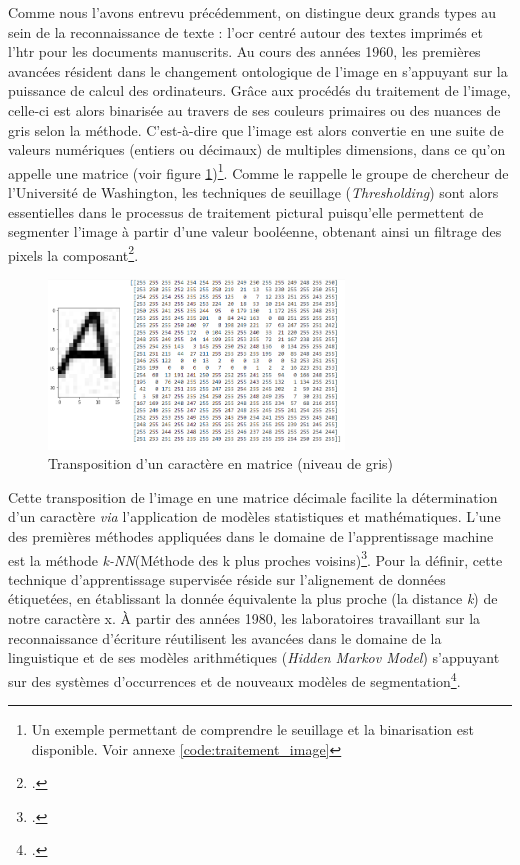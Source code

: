 	Comme nous l'avons entrevu précédemment, on distingue deux grands types au sein de la reconnaissance de texte : l'\gls{ocr} centré autour des textes imprimés et l'\gls{htr} pour les documents manuscrits. Au cours des années 1960, les premières avancées résident dans le changement ontologique de l'image en s'appuyant sur la puissance de calcul des ordinateurs. Grâce aux procédés du traitement de l'image, celle-ci est alors binarisée au travers de ses couleurs primaires ou des nuances de gris selon la méthode. C'est-à-dire que l'image est alors convertie en une suite de valeurs numériques (entiers ou décimaux) de multiples dimensions, dans ce qu'on appelle une matrice (voir figure \ref{fig:a_matrix})\footnote{Un exemple permettant de comprendre le seuillage et la binarisation est disponible. Voir annexe \ref{code:traitement_image}}. Comme le rappelle le groupe de chercheur de l'Université de Washington, les techniques de seuillage (\textit{Thresholding}) sont alors essentielles dans le processus de traitement pictural puisqu'elle permettent de segmenter l'image à partir d'une valeur booléenne, obtenant ainsi un filtrage des pixels la composant\footcite{guptaOCRBinarizationImage2007}.
	
	\begin{figure}[h]
	    \centering
	    \includegraphics[width=0.7\textwidth]{annexes/img/A_to_matrix.png}
	    \caption{Transposition d'un caractère en matrice (niveau de gris)}
	    \label{fig:a_matrix}
	\end{figure}
	
	Cette transposition de l'image en une matrice décimale facilite la détermination d'un caractère \textit{via} l'application de modèles statistiques et mathématiques. L'une des premières méthodes appliquées dans le domaine de l'apprentissage machine est la méthode \textit{k-NN}(Méthode des k plus proches voisins)\footcite[p.~39]{terrielRepresenterEvaluerDonnees2020}. Pour la définir, cette technique d'apprentissage supervisée réside sur l'alignement de données étiquetées, en établissant la donnée équivalente la plus proche (la distance \textit{k}) de notre caractère x. À partir des années 1980, les laboratoires travaillant sur la reconnaissance d'écriture réutilisent les avancées dans le domaine de la linguistique et de ses modèles arithmétiques (\textit{Hidden Markov Model}) s'appuyant sur des systèmes d'occurrences et de nouveaux modèles de segmentation\footcite[p.~40]{terrielRepresenterEvaluerDonnees2020}.
	
